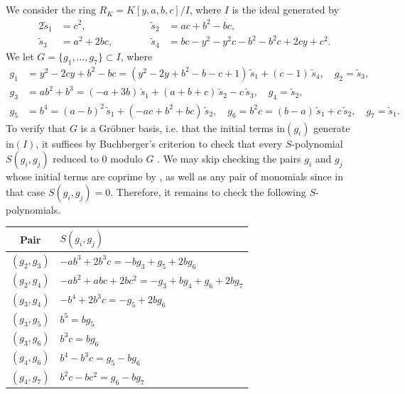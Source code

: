 \documentclass[a4paper, notitlepage, 10pt]{amsart}
\theoremstyle{plain} %
\theoremstyle{definition} %
\theoremstyle{remark} %
\numberwithin{equation}{section}
\begin{document}
\subsection{} We consider the ring $R_K=K[y,a,b,c]/I$, where $I$ is the ideal generated by 
\begin{alignat*}{2}
    \widetilde{s}_1 &= c^2, &\quad\quad\quad
    \widetilde{s}_2 &= ac + b^2 - bc, 
     \\\widetilde{s}_3 &= a^2 + 2bc, &\quad\quad\quad
    \widetilde{s}_4 &= bc - y^2 - y^2c - b^2 - b^2c + 2cy + c^2.
\end{alignat*}
We let $G=\{g_1,\dots,g_7\}\subset I$, where 
\begin{align*}
g_1 &= y^2-2cy+b^2-bc = (y^2 - 2y + b^2 - b - c + 1)\,\widetilde{s}_1 + (c-1)\,\widetilde{s}_4, \quad g_2 = \widetilde{s}_3, \\
g_3 &= ab^2+b^3 = (-a+3b)\,\widetilde{s}_1 + (a+b+c)\,\widetilde{s}_2 - c\,\widetilde{s}_3, \quad g_4 = \widetilde{s}_2, \\
g_5 &= b^4 = (a-b)^2\,\widetilde{s}_1 + (-ac+b^2+bc)\,\widetilde{s}_2, \quad g_6 = b^2c = (b-a)\,\widetilde{s}_1 + c\,\widetilde{s}_2, \quad g_7 = \widetilde{s}_1.
\end{align*}
To verify that $G$ is a Gröbner basis, i.e. that the initial terms $\mathrm{in}(g_i)$ generate $\mathrm{in
}(I)$, 
it suffices by Buchberger's criterion \cite[Theorem 15.8]{Eisen} to check that every $S$-polynomial $S(g_i,g_j)$ reduced to $0$ modulo $G$ . 
We may skip checking the pairs $g_i$ and $g_j$ whose initial terms are coprime by \cite[Exercise 15.20]{Eisen}, as well as any pair of monomials since in that case $S(g_i,g_j)=0$. Therefore, it remains to check the following $S$-polynomials.
{\begin{table}[h]
\centering
\footnotesize
{\renewcommand{\arraystretch}{0.96}
\begin{tabular}{|c|l|}
\hline
Pair & $S(g_i,g_j)  $ \\
\hline
$(g_2,g_3)$ & $-ab^3 + 2b^3c = -b g_3 + g_5 + 2b g_6$ \\
$(g_2,g_4)$ & $-ab^2 + abc + 2bc^2 = -g_3 + b g_4 + g_6 + 2b g_7$ \\
$(g_3,g_4)$ & $-b^4 + 2b^3c = -g_5 + 2b g_6$ \\
$(g_3,g_5)$ & $b^5 = b g_5$ \\
$(g_3,g_6)$ & $b^3c = b g_6$ \\
$(g_4,g_6)$ & $b^4 - b^3c = g_5 - b g_6$ \\
$(g_4,g_7)$ & $b^2c - bc^2 = g_6 - b g_7$ \\
\hline
\end{tabular}}
\end{table}}
\end{document}
